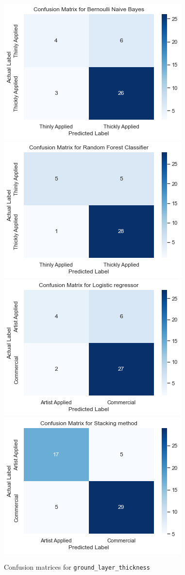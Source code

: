 \documentclass[11pt, oneside]{article}
\begin{document}
\begin{figure}[H]
\includegraphics[width=.5\textwidth]{images/matNBThic.png}\hfill
\includegraphics[width=.5\textwidth]{images/matRFThic.png} 
\\[\smallskipamount]
\includegraphics[width=.5\textwidth]{images/matLRThic.png}\hfill
\includegraphics[width=.5\textwidth]{images/matStackThic.png}\hfill
\caption{Confusion matrices for \texttt{ground\_layer\_thickness}}
\label{matThic}
\end{figure}
\end{document}
